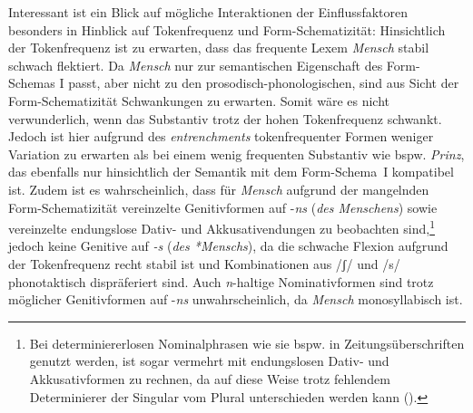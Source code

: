 Interessant ist ein Blick auf mögliche Interaktionen der Einflussfaktoren besonders in Hinblick auf Tokenfrequenz und Form-Schematizität: Hinsichtlich der Tokenfrequenz ist zu erwarten, dass das frequente Lexem \textit{Mensch} stabil schwach flektiert. Da \textit{Mensch} nur zur semantischen Eigenschaft des Form-Schemas I passt, aber nicht zu den prosodisch-phonolo\-gisch\-en, sind aus Sicht der Form-Sche\-ma\-ti\-zi\-tät Schwankungen zu erwarten. Somit wäre es nicht verwunderlich, wenn das Substantiv trotz der hohen Tokenfrequenz schwankt. Jedoch ist hier aufgrund des \textit{entrenchments} tokenfrequenter Formen weniger Variation zu erwarten als bei einem wenig frequenten Substantiv wie bspw. \textit{Prinz}, das ebenfalls nur hinsichtlich der Semantik mit dem Form-Schema~I kompatibel ist. Zudem ist es wahrscheinlich, dass für \textit{Mensch} aufgrund der mangelnden Form-Schematizität vereinzelte Genitivformen auf -\textit{ns} (\textit{des Menschens}) sowie vereinzelte endungslose Dativ- und Akkusativendungen zu beobachten sind,\footnote{Bei determiniererlosen Nominalphrasen wie sie bspw. in Zeitungsüberschriften genutzt werden, ist sogar vermehrt mit endungslosen Dativ- und Akkusativformen zu rechnen, da auf diese Weise trotz fehlendem Determinierer der Singular vom Plural unterschieden werden kann (\cite[116--117]{Thieroff.2003}).} jedoch keine Genitive auf \textit{-s} (\textit{des *Menschs}), da die schwache Flexion aufgrund der Tokenfrequenz recht stabil ist und Kombinationen aus /ʃ/ und /s/ phonotaktisch dispräferiert sind. Auch \textit{n}-haltige Nominativformen sind trotz möglicher Genitivformen auf -\textit{ns} unwahrscheinlich, da \textit{Mensch} monosyllabisch ist. 

